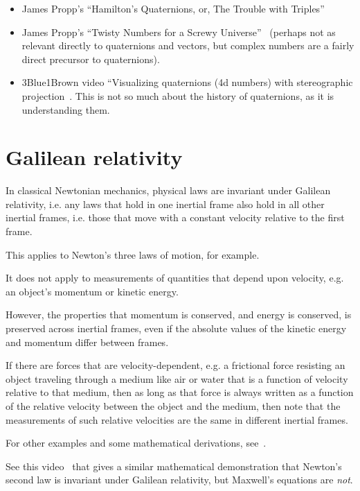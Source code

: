 \documentclass[a4paper]{article}
\theoremstyle{plain}
\theoremstyle{definition}
\begin{document}
\begin{itemize}

\item James Propp's ``Hamilton's Quaternions, or, The Trouble with
  Triples''~\cite{HamiltonsQuaternions}

\item James Propp's ``Twisty Numbers for a Screwy
  Universe''~\cite{TwistyNumbers} (perhaps not as relevant directly to
  quaternions and vectors, but complex numbers are a fairly direct
  precursor to quaternions).

\item 3Blue1Brown video ``Visualizing quaternions (4d numbers) with
  stereographic projection~\cite{VisualizingQuaternions}.  This is not
  so much about the history of quaternions, as it is understanding
  them.

\end{itemize}


\section{Galilean relativity}

In classical Newtonian mechanics, physical laws are invariant under
Galilean relativity, i.e. any laws that hold in one inertial frame
also hold in all other inertial frames, i.e. those that move with a
constant velocity relative to the first frame.

This applies to Newton's three laws of motion, for example.

It does not apply to measurements of quantities that depend upon
velocity, e.g. an object's momentum or kinetic energy.

However, the properties that momentum is conserved, and energy is
conserved, is preserved across inertial frames, even if the absolute
values of the kinetic energy and momentum differ between frames.

If there are forces that are velocity-dependent, e.g. a frictional
force resisting an object traveling through a medium like air or water
that is a function of velocity relative to that medium, then as long
as that force is always written as a function of the relative velocity
between the object and the medium, then note that the measurements of
such relative velocities are the same in different inertial frames.

For other examples and some mathematical derivations,
see~\cite{GalileanTransformation}.

See this video~\cite{GalileanInvarianceMaxwellsEquations} that gives a
similar mathematical demonstration that Newton's second law is
invariant under Galilean relativity, but Maxwell's equations are {\em
  not}.
\end{document}
